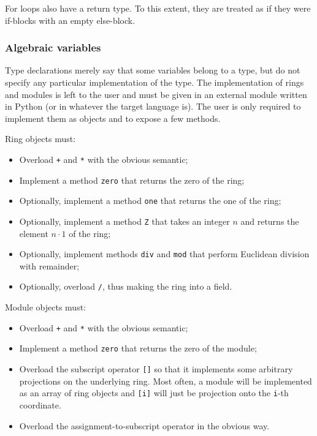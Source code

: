For loops also have a return type. To this extent, they are treated as
if they were if-blocks with an empty else-block.



\subsubsection{Algebraic variables}
\label{sec:algebraicvar}
 Type declarations merely say that some
variables belong to a type, but do not specify any particular
implementation of the type. The implementation of rings and modules is
left to the user and must be given in an external module written in
Python (or in whatever the target language is). The user is only
required to implement them as objects and to expose a few methods.

Ring objects must:
\begin{itemize}
\item Overload \lstinline-+- and \lstinline+*+ with the obvious semantic;
\item Implement a method \lstinline-zero- that returns the zero of the ring;
\item Optionally, implement a method \lstinline-one- that returns the
  one of the ring;
\item Optionally, implement a method \lstinline-Z- that takes an
  integer $n$ and returns the element $n\cdot 1$ of the ring;
\item Optionally, implement methods \lstinline+div+ and
  \lstinline+mod+ that perform Euclidean division with remainder;
\item Optionally, overload \lstinline+/+, thus making the ring into a
  field.
\end{itemize}

Module objects must:
\begin{itemize}
\item Overload \lstinline-+- and \lstinline+*+ with the obvious semantic;
\item Implement a method \lstinline-zero- that returns the zero of the
  module;
\item Overload the subscript operator \lstinline+[]+ so that it
  implements some arbitrary projections on the underlying ring. Most
  often, a module will be implemented as an array of ring objects and
  \lstinline+[i]+ will just be projection onto the \lstinline+i+-th
  coordinate.
\item Overload the assignment-to-subscript operator in the obvious
  way.
\end{itemize}

